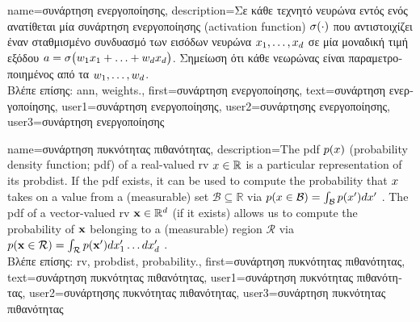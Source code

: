 {name={\foreignlanguage{greek}{συνάρτηση ενεργοποίησης}},
	description={\foreignlanguage{greek}{Σε κάθε τεχνητό νευρώνα εντός ενός} 
		 \foreignlanguage{greek}{ανατίθεται μία συνάρτηση ενεργοποίησης} (activation function)   
		$\sigma(\cdot)$ \foreignlanguage{greek}{που αντιστοιχίζει έναν σταθμισμένο συνδυασμό των εισόδων 
		νευρώνα} $x_{1},\ldots,x_{d}$ \foreignlanguage{greek}{σε μία μοναδική τιμή εξόδου} 
		$a = \sigma\big(w_{1} x_{1}+\ldots+w_{d} x_{d} \big)$. 
		\foreignlanguage{greek}{Σημείωση ότι κάθε νεωρώνας είναι παραμετροποιημένος από τα} 
		 $w_{1},\ldots,w_{d}$.\\
		\foreignlanguage{greek}{Βλέπε επίσης:} \gls{ann}, \gls{weights}.},
first={\foreignlanguage{greek}{συνάρτηση ενεργοποίησης}},
text={\foreignlanguage{greek}{συνάρτηση ενεργοποίησης}},
user1={\foreignlanguage{greek}{συνάρτηση ενεργοποίησης}}, %
user2={\foreignlanguage{greek}{συνάρτησης ενεργοποίησης}}, %
user3={\foreignlanguage{greek}{συνάρτηση ενεργοποίησης}} %
}

{name={\foreignlanguage{greek}{συνάρτηση πυκνότητας πιθανότητας}},
	description={The pdf $p(x)$ (probability density function; pdf)
		of a real-valued \gls{rv} $x \in \mathbb{R}$ is a particular representation of its \gls{probdist}. 
		If the pdf exists, it can be used to compute the \gls{probability} that $x$ takes on a value 
		from a (measurable) set $\mathcal{B} \subseteq \mathbb{R}$ via $p({x \in \mathcal{B}}) = \int_{\mathcal{B}} p(x') d x'$ \cite[Ch. 3]{BertsekasProb}. 
		The pdf of a vector-valued \gls{rv} ${\bf x} \in \mathbb{R}^{d}$ (if it exists) 
        allows us to compute the \gls{probability} of ${\bf x}$ belonging to a (measurable) region $\mathcal{R}$ via 
        $p({{\bf x} \in \mathcal{R}}) = \int_{\mathcal{R}} p({\bf x}') d x_{1}' \ldots d x_{d}' $ \cite[Ch. 3]{BertsekasProb}.\\
        \foreignlanguage{greek}{Βλέπε επίσης:} \gls{rv}, \gls{probdist}, \gls{probability}.},
first={\foreignlanguage{greek}{συνάρτηση πυκνότητας πιθανότητας}},
text={\foreignlanguage{greek}{συνάρτηση πυκνότητας πιθανότητας}},
user1={\foreignlanguage{greek}{συνάρτηση πυκνότητας πιθανότητας}}, %
user2={\foreignlanguage{greek}{συνάρτησης πυκνότητας πιθανότητας}}, %
user3={\foreignlanguage{greek}{συνάρτηση πυκνότητας πιθανότητας}} %
}

